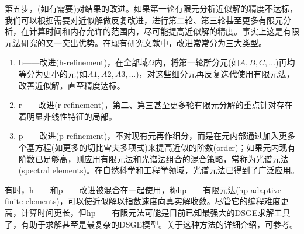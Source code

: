 第五步，(如有需要)对结果的改进。如果第一轮有限元分析近似解的精度不达标，我们可以根据需要对近似解做反复改进，进行第二轮、第三轮甚至更多有限元分析，在计算时间和内存允许的范围内，尽可能提高近似解的精度。事实上这是有限元法研究的又一突出优势。在现有研究文献中，改进常常分为三大类型。
\begin{enumerate}
  \item h——改进(h-refinement)，在全部域$\Omega$内，将第一轮所分元(如$A,B,C, \ldots$)再均等分为更小的元(如$A1,A2,A3, \ldots$)，对这些细分元再反复迭代使用有限元法，改善近似解，直至精度达标。
  \item r——改进(r-refinement)，第二、第三甚至更多轮有限元分解的重点针对存在着明显非线性特征的局部。
  \item p——改进(p-refinement)，不对现有元再作细分，而是在元内部通过加入更多个基方程(如更多的切比雪夫多项式)来提高近似的阶数(order)；如果元内现有阶数已足够高，则应用有限元法和光谱法组合的混合策略，常称为光谱元法(spectral elements)。在自然科学和工程学领域，光谱元法已得到了广泛应用\citep{Solin:2003up}。
\end{enumerate}

有时，h——和p——改进被混合在一起使用，称hp——有限元法(hp-adaptive finite elements)，可以使近似解以指数速度向真实解收敛\citep{Ciarlet:2002tm}。尽管它的编程难度更高，计算时间更长，但hp——有限元法可能是目前已知最强大的DSGE求解工具了，有助于求解甚至是最复杂的DSGE模型。关于这种方法的详细介绍，可参考\cite{Babuska:1994jz,Demkowicz:2006ww,Demkowicz:2007ur}。

